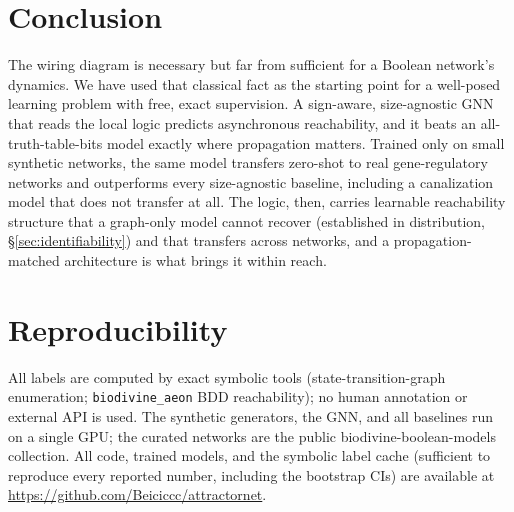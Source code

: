 \documentclass[journal]{IEEEtran}
\begin{document}
\section{Conclusion}
The wiring diagram is necessary but far from sufficient for a Boolean network's
dynamics. We have used that classical fact as the starting point for a well-posed
learning problem with free, exact supervision. A sign-aware, size-agnostic GNN that
reads the local logic predicts asynchronous reachability, and it beats an
all-truth-table-bits model exactly where propagation matters. Trained only on small
synthetic networks, the same model transfers zero-shot to real gene-regulatory networks
and outperforms every size-agnostic baseline, including a canalization model that does
not transfer at all. The logic, then, carries learnable reachability structure that a
graph-only model cannot recover (established in distribution, \S\ref{sec:identifiability})
and that transfers across networks, and a propagation-matched architecture is what brings
it within reach.

\section*{Reproducibility}
All labels are computed by exact symbolic tools (state-transition-graph enumeration;
\texttt{biodivine\_aeon} BDD reachability); no human annotation or external API is used.
The synthetic generators, the GNN, and all baselines run on a single GPU; the curated
networks are the public biodivine-boolean-models collection. All code, trained models,
and the symbolic label cache (sufficient to reproduce every reported number, including
the bootstrap CIs) are available at \url{https://github.com/Beiciccc/attractornet}.
\end{document}
